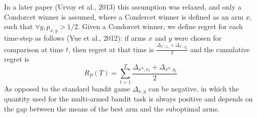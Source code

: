 \documentclass{llncs}
\begin{document}
		 In a later paper (Urvoy et al., 2013) this assumption was relaxed, and only a Condorcet winner is assumed, where a Condercet winner is defined as an arm $x$, such that $ \forall y, p_{x,y} > 1/2$. 
		 Given a Condorcet winner, we define regret for each time-step as follows (Yue et al., 2012): if arms $x$ and $y$ were chosen for comparison at time $t$, then regret at that time is $ \frac{\Delta_{x^*,x_t}+\Delta_{x^*,y_t}}{2} $ and the cumulative regret is
		 \begin{equation}
		 R_P(T) = \sum_{t=1}^T \frac{\Delta_{x*,x_t}+\Delta_{x*,y_t}}{2}
		 \end{equation}
		 As opposed to the standard bandit game $\Delta_{x,y}$ can be negative, in which the quantity used for the multi-armed bandit task is always positive and depends on the gap between the means of the best arm and the suboptimal arms.
		 
\end{document}
